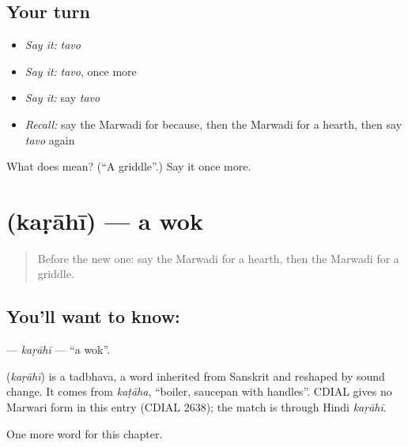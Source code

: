 \subsection*{Your turn}
\begin{itemize}
\raggedright
  \item \emph{Say it:} \emph{tavo}
  \item \emph{Say it:} \emph{tavo}, once more
  \item \emph{Say it:} say \emph{tavo}
  \item \emph{Recall:} say the Marwadi for because, then the Marwadi for a hearth, then say \emph{tavo} again
\end{itemize}

\begin{tcolorbox}[breakable,colback=teal!4,colframe=teal!35!black,title={Before you move on}]
What does  mean? (\textquotedblleft{}A griddle\textquotedblright{}.) Say it once more.
\end{tcolorbox}
\section[\texorpdfstring{\mw{कड़ाही} (kaṛāhī)}{कड़ाही (kaṛāhī)}]{ (kaṛāhī) — a wok}

\label{lesson:MW-C118-karahi}



\begin{quote}
Before the new one: say the Marwadi for a hearth, then the Marwadi for a griddle.
\end{quote}

\subsection*{You'll want to know: }
\textbf{} — \emph{kaṛāhī} — \textquotedblleft{}a wok\textquotedblright{}.

\begin{cousinweb}
\textbf{} (\emph{kaṛāhī}) is a tadbhava, a word inherited from Sanskrit and reshaped by sound change. It comes from \emph{kaṭāha}, \textquotedblleft{}boiler, saucepan with handles\textquotedblright{}. CDIAL gives no Marwari form in this entry (CDIAL 2638); the match is through Hindi \emph{kaṛāhī}.
\end{cousinweb}

\begin{grammarlens}[title={What you've built}]
One more word for this chapter.
\end{grammarlens}

